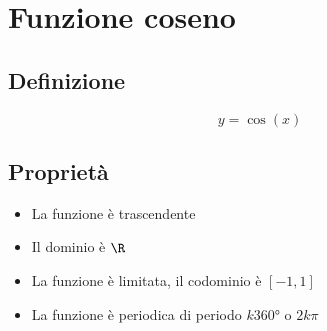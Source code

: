 \chapter{Funzione coseno}
\section{Definizione}
\begin{equation}
y=\cos(x)
\end{equation}
\section{Proprietà}
\begin{itemize}
	\item La funzione è trascendente
\item Il dominio è $\R$
\item La funzione è limitata, il codominio è $[-1,1]$
\item La funzione è periodica di periodo $k\ang{360;;}$ o $2k\pi$
\end{itemize}
\begin{center}
	
\end{center}